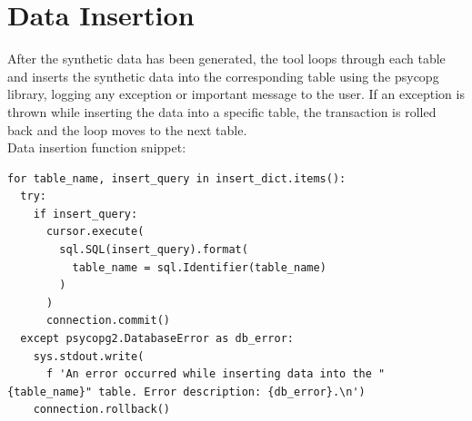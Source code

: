 \section{Data Insertion}
After the synthetic data has been generated, the tool loops through each table and inserts the synthetic data into the corresponding table using the psycopg library, logging any exception or important message to the user. If an exception is thrown while inserting the data into a specific table, the transaction is rolled back and the loop moves to the next table.\\
\newline
Data insertion function snippet:
\begin{verbatim}
for table_name, insert_query in insert_dict.items():
  try:
    if insert_query:
      cursor.execute(
        sql.SQL(insert_query).format(
          table_name = sql.Identifier(table_name)
        )
      ) 
      connection.commit()
  except psycopg2.DatabaseError as db_error:
    sys.stdout.write(
      f 'An error occurred while inserting data into the "{table_name}" table. Error description: {db_error}.\n')
    connection.rollback()
\end{verbatim}